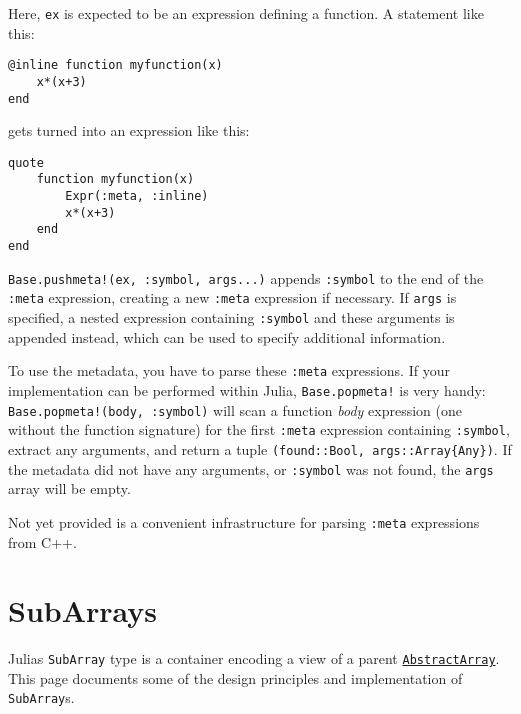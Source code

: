 Here, \texttt{ex} is expected to be an expression defining a function. A statement like this:




\begin{verbatim}
@inline function myfunction(x)
    x*(x+3)
end
\end{verbatim}



gets turned into an expression like this:




\begin{verbatim}
quote
    function myfunction(x)
        Expr(:meta, :inline)
        x*(x+3)
    end
end
\end{verbatim}



\texttt{Base.pushmeta!(ex, :symbol, args...)} appends \texttt{:symbol} to the end of the \texttt{:meta} expression, creating a new \texttt{:meta} expression if necessary. If \texttt{args} is specified, a nested expression containing \texttt{:symbol} and these arguments is appended instead, which can be used to specify additional information.



To use the metadata, you have to parse these \texttt{:meta} expressions. If your implementation can be performed within Julia, \texttt{Base.popmeta!} is very handy: \texttt{Base.popmeta!(body, :symbol)} will scan a function \emph{body} expression (one without the function signature) for the first \texttt{:meta} expression containing \texttt{:symbol}, extract any arguments, and return a tuple \texttt{(found::Bool, args::Array\{Any\})}. If the metadata did not have any arguments, or \texttt{:symbol} was not found, the \texttt{args} array will be empty.



Not yet provided is a convenient infrastructure for parsing \texttt{:meta} expressions from C++.



\hypertarget{16299844357766264666}{}


\section{SubArrays}



Julia{\textquotesingle}s \texttt{SubArray} type is a container encoding a {\textquotedbl}view{\textquotedbl} of a parent \hyperlink{6514416309183787338}{\texttt{AbstractArray}}.  This page documents some of the design principles and implementation of \texttt{SubArray}s.



